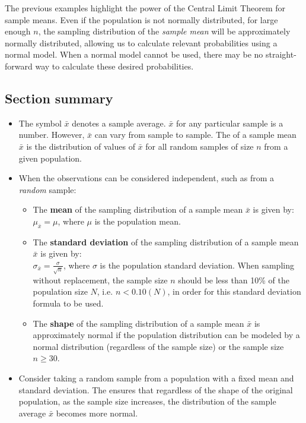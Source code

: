 The previous examples highlight the power of the Central Limit Theorem for sample means.  Even if the population is not normally distributed, for large enough $n$, the sampling distribution of the \emph{sample mean} will be approximately normally distributed, allowing us to calculate relevant probabilities using a normal model.  When a normal model cannot be used, there may be no straight-forward way to calculate these desired probabilities.

\D{\newpage}

\subsection*{Section summary}

\begin{itemize}
\item The symbol $\bar{x}$ denotes a sample average.  $\bar{x}$ for any particular sample is a number.  However, $\bar{x}$ can vary from sample to sample.   The  of a sample mean $\bar{x}$ is the distribution of values of $\bar{x}$ for all random samples of size $n$ from a given population.  

\item When the observations can be considered independent, such as from a \emph{random} sample:
\begin{itemize}
\item The \textbf{mean} of the sampling distribution of a sample mean $\bar{x}$ is given by: \\
 $\mu_{\bar{x}} = \mu$, where $\mu$ is the population mean.

\item The \textbf{standard deviation} of the sampling distribution of a
sample mean $\bar{x}$ is given by: \\
$\sigma_{\bar{x}} = \frac{\sigma}{\sqrt{n}}$, where $\sigma$ is the population standard deviation.  When sampling without replacement, the sample size $n$ should be less than 10\% of the population size $N$, i.e. $n < 0.10(N)$, in order for this standard deviation formula to be used.

\item The \textbf{shape} of the sampling distribution of a sample mean $\bar{x}$ is approximately normal if the population distribution can be modeled by a normal distribution (regardless of the sample size) or the sample size $n \ge 30$.  
\end{itemize}


\item Consider taking a random sample from a population with a fixed mean and standard deviation.  The  ensures that regardless of the shape of the original population, as the sample size increases, the distribution of the sample average $\bar{x}$ becomes more normal.  


\end{itemize}

